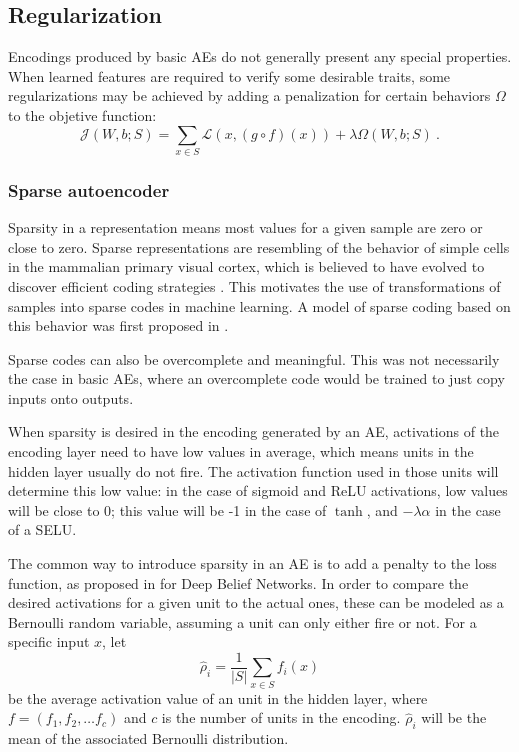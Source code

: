 \subsection{Regularization}\label{p1Sec.Regularization}

Encodings produced by basic AEs do not generally present any special properties. When learned features are required to verify some desirable traits, some regularizations may be achieved by adding a penalization for certain behaviors $\Omega$ to the objetive function: 
\begin{equation}
  \mathcal J(W,b;S)=\sum_{x\in S} \mathcal L(x, (g\circ f)(x)) + \lambda\Omega(W,b;S)~.
\end{equation}

\subsubsection{Sparse autoencoder}\label{p1Sec.SparseAE}

Sparsity in a representation means most values for a given sample are zero or close to zero. Sparse representations are resembling of the behavior of simple cells in the mammalian primary visual cortex, which is believed to have evolved to discover efficient coding strategies . This motivates the use of transformations of samples into sparse codes in machine learning. A model of sparse coding based on this behavior was first proposed in .

Sparse codes can also be overcomplete and meaningful. This was not necessarily the case in basic AEs, where an overcomplete code would be trained to just copy inputs onto outputs.

When sparsity is desired in the encoding generated by an AE, activations of the encoding layer need to have low values in average, which means units in the hidden layer usually do not fire. The activation function used in those units will determine this low value: in the case of sigmoid and ReLU activations, low values will be close to 0; this value will be -1 in the case of $\tanh$, and $-\lambda\alpha$ in the case of a SELU. 

The common way to introduce sparsity in an AE is to add a penalty to the loss function, as proposed in  for Deep Belief Networks. In order to compare the desired activations for a given unit to the actual ones, these can be modeled as a Bernoulli random variable, assuming a unit can only either fire or not. For a specific input $x$, let
\begin{equation}
  \hat\rho_i=\frac{1}{\left\lvert S\right\rvert} \sum_{x\in S} f_i(x)
\end{equation}
be the average activation value of an unit in the hidden layer, where $f=(f_1,f_2,\dots f_c)$ and $c$ is the number of units in the encoding. $\hat\rho_i$ will be the mean of the associated Bernoulli distribution.


